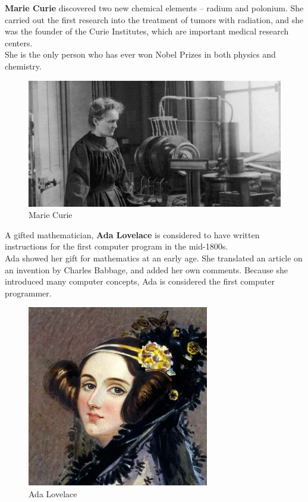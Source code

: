 \documentclass[a4paper,10pt]{article}
\begin{document}
\newblock
\textbf{Marie Curie} discovered two new chemical elements – radium and polonium. She carried out the first research into the treatment of tumors with radiation, and she was the founder of the Curie Institutes, which are important medical research centers.
\\
She is the only person who has ever won Nobel Prizes in both physics and chemistry.\cite{curie}

\begin{center}
\begin{figure}[h]
\centering
 \includegraphics[scale=0.2]{curie.jpg}
 \caption{Marie Curie}
\end{figure}
\end{center}

\newblock
A gifted mathematician, \textbf{Ada Lovelace} is considered to have written instructions for the first computer program in the mid-1800s.\\Ada showed her gift for mathematics at an early age. She translated an article on an invention by Charles Babbage, and added her own comments. Because she introduced many computer concepts, Ada is considered the first computer programmer.\cite{ada}

\begin{center}
\begin{figure}[h]
\centering
 \includegraphics[scale=0.5]{ada.jpg}
 \caption{Ada Lovelace}
\end{figure}
\end{center}
\end{document}
